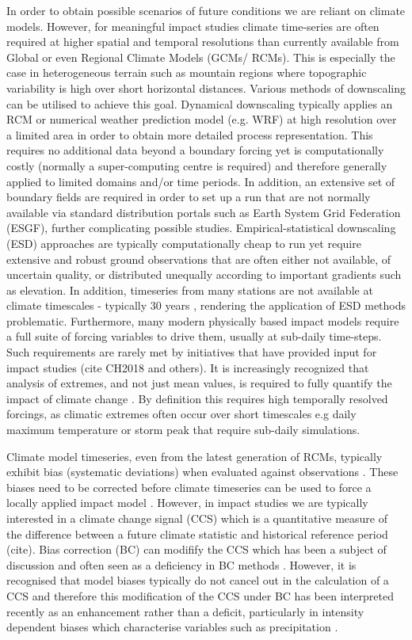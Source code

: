 \documentclass[hess, manuscript]{copernicus}
\begin{document}
In order to obtain possible scenarios of future conditions we are reliant on climate models. However, for meaningful impact studies climate time-series are often required at higher spatial and temporal resolutions than currently available from Global or even Regional Climate Models (GCMs/ RCMs). This is especially the case in heterogeneous terrain such as mountain regions where topographic variability is high over short horizontal distances. Various methods of downscaling can be utilised to achieve this goal. Dynamical downscaling typically applies an RCM or numerical weather prediction model (e.g. WRF) at high resolution over a limited area in order to obtain more detailed process representation. This requires no additional data beyond a boundary forcing yet is computationally costly (normally a super-computing centre is required) and therefore generally applied to limited domains and/or time periods. In addition, an extensive set of boundary fields are required in order to set up a run that are not normally available via standard distribution portals such as Earth System Grid Federation (ESGF), further complicating possible studies. Empirical-statistical downscaling (ESD) approaches are typically computationally cheap to run yet require extensive and robust ground observations that are often either not available, of uncertain quality, or distributed unequally according to important gradients such as elevation. In addition, timeseries from many stations are not available at climate timescales - typically 30 years \citep{Arguez2011-qv}, rendering the application of ESD methods problematic. Furthermore, many modern physically based impact models require a full suite of forcing variables to drive them, usually at sub-daily time-steps. Such requirements are rarely met by initiatives that have provided input for impact studies (cite CH2018 and others). It is increasingly recognized that analysis of extremes, and not just mean values, is required to fully quantify the impact of climate change \citep{Katz1992-xb}. By definition this requires high temporally resolved forcings, as climatic extremes often occur over short timescales e.g daily maximum temperature or storm peak that require sub-daily simulations.

Climate model timeseries, even from the latest generation of RCMs, typically exhibit bias (systematic deviations) when evaluated against observations \citep{Ivanov2018-vz, Kotlarski2014-rf}. These biases need to be corrected before climate timeseries can be used to force a locally applied impact model \citep{Wood2004-vu}. However, in impact studies we are typically interested in a climate change signal (CCS) which is a quantitative measure of the difference between a future climate statistic and historical reference period (cite). Bias correction (BC) can modifify the CCS \citep{Ivanov2018-vz, Themesl2012-um}  which has been a subject of discussion and often seen as a deficiency in BC methods \citep{Hempel2013-sj}. However, it is recognised that model biases typically do not cancel out in the calculation of a CCS  and therefore this modification of the CCS under BC has been interpreted recently as an enhancement rather than a deficit, particularly in intensity dependent biases which characterise variables such as precipitation \citep{Gobiet2015-yw}.
\end{document}
